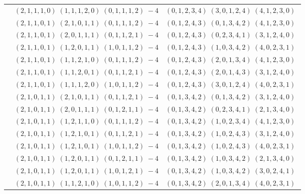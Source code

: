 \documentclass[11pt]{article}
\begin{document}
\begin{longtable}[l]{|c|c|c|}
 \cline{2-3} 
 & $(2 ,1 ,1 ,1 ,0) \;(1 ,1 ,1 ,2 ,0) \;(0 ,1 ,1 ,1 ,2) \;-4$ & $(0 ,1 ,2 ,3 ,4) \;(3 ,0 ,1 ,2 ,4) \;(4 ,1 ,2 ,3 ,0) \;$\\ 
 \cline{2-3} 
 & $(2 ,1 ,1 ,0 ,1) \;(2 ,1 ,0 ,1 ,1) \;(0 ,1 ,1 ,1 ,2) \;-4$ & $(0 ,1 ,2 ,4 ,3) \;(0 ,1 ,3 ,4 ,2) \;(4 ,1 ,2 ,3 ,0) \;$\\ 
 \cline{2-3} 
 & $(2 ,1 ,1 ,0 ,1) \;(2 ,0 ,1 ,1 ,1) \;(0 ,1 ,1 ,2 ,1) \;-4$ & $(0 ,1 ,2 ,4 ,3) \;(0 ,2 ,3 ,4 ,1) \;(3 ,1 ,2 ,4 ,0) \;$\\ 
 \cline{2-3} 
 & $(2 ,1 ,1 ,0 ,1) \;(1 ,2 ,0 ,1 ,1) \;(1 ,0 ,1 ,1 ,2) \;-4$ & $(0 ,1 ,2 ,4 ,3) \;(1 ,0 ,3 ,4 ,2) \;(4 ,0 ,2 ,3 ,1) \;$\\ 
 \cline{2-3} 
 & $(2 ,1 ,1 ,0 ,1) \;(1 ,1 ,2 ,1 ,0) \;(0 ,1 ,1 ,1 ,2) \;-4$ & $(0 ,1 ,2 ,4 ,3) \;(2 ,0 ,1 ,3 ,4) \;(4 ,1 ,2 ,3 ,0) \;$\\ 
 \cline{2-3} 
 & $(2 ,1 ,1 ,0 ,1) \;(1 ,1 ,2 ,0 ,1) \;(0 ,1 ,1 ,2 ,1) \;-4$ & $(0 ,1 ,2 ,4 ,3) \;(2 ,0 ,1 ,4 ,3) \;(3 ,1 ,2 ,4 ,0) \;$\\ 
 \cline{2-3} 
 & $(2 ,1 ,1 ,0 ,1) \;(1 ,1 ,1 ,2 ,0) \;(1 ,0 ,1 ,1 ,2) \;-4$ & $(0 ,1 ,2 ,4 ,3) \;(3 ,0 ,1 ,2 ,4) \;(4 ,0 ,2 ,3 ,1) \;$\\ 
 \cline{2-3} 
 & $(2 ,1 ,0 ,1 ,1) \;(2 ,1 ,0 ,1 ,1) \;(0 ,1 ,1 ,2 ,1) \;-4$ & $(0 ,1 ,3 ,4 ,2) \;(0 ,1 ,3 ,4 ,2) \;(3 ,1 ,2 ,4 ,0) \;$\\ 
 \cline{2-3} 
 & $(2 ,1 ,0 ,1 ,1) \;(2 ,0 ,1 ,1 ,1) \;(0 ,1 ,2 ,1 ,1) \;-4$ & $(0 ,1 ,3 ,4 ,2) \;(0 ,2 ,3 ,4 ,1) \;(2 ,1 ,3 ,4 ,0) \;$\\ 
 \cline{2-3} 
 & $(2 ,1 ,0 ,1 ,1) \;(1 ,2 ,1 ,1 ,0) \;(0 ,1 ,1 ,1 ,2) \;-4$ & $(0 ,1 ,3 ,4 ,2) \;(1 ,0 ,2 ,3 ,4) \;(4 ,1 ,2 ,3 ,0) \;$\\ 
 \cline{2-3} 
 & $(2 ,1 ,0 ,1 ,1) \;(1 ,2 ,1 ,0 ,1) \;(0 ,1 ,1 ,2 ,1) \;-4$ & $(0 ,1 ,3 ,4 ,2) \;(1 ,0 ,2 ,4 ,3) \;(3 ,1 ,2 ,4 ,0) \;$\\ 
 \cline{2-3} 
 & $(2 ,1 ,0 ,1 ,1) \;(1 ,2 ,1 ,0 ,1) \;(1 ,0 ,1 ,1 ,2) \;-4$ & $(0 ,1 ,3 ,4 ,2) \;(1 ,0 ,2 ,4 ,3) \;(4 ,0 ,2 ,3 ,1) \;$\\ 
 \cline{2-3} 
 & $(2 ,1 ,0 ,1 ,1) \;(1 ,2 ,0 ,1 ,1) \;(0 ,1 ,2 ,1 ,1) \;-4$ & $(0 ,1 ,3 ,4 ,2) \;(1 ,0 ,3 ,4 ,2) \;(2 ,1 ,3 ,4 ,0) \;$\\ 
 \cline{2-3} 
 & $(2 ,1 ,0 ,1 ,1) \;(1 ,2 ,0 ,1 ,1) \;(1 ,0 ,1 ,2 ,1) \;-4$ & $(0 ,1 ,3 ,4 ,2) \;(1 ,0 ,3 ,4 ,2) \;(3 ,0 ,2 ,4 ,1) \;$\\ 
 \cline{2-3} 
 & $(2 ,1 ,0 ,1 ,1) \;(1 ,1 ,2 ,1 ,0) \;(1 ,0 ,1 ,1 ,2) \;-4$ & $(0 ,1 ,3 ,4 ,2) \;(2 ,0 ,1 ,3 ,4) \;(4 ,0 ,2 ,3 ,1) \;$\\ 

\end{longtable}
\end{document}
